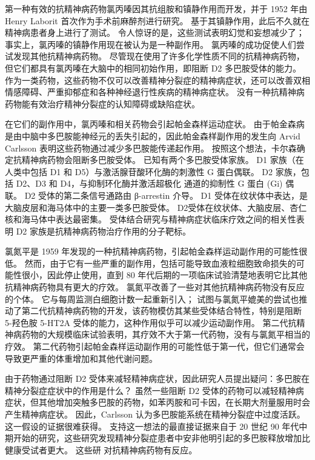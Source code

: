 第一种有效的抗精神病药物氯丙嗪因其抗组胺和镇静作用而开发，并于 1952 年由 Henry Laborit 首次作为手术前麻醉剂进行研究。
基于其镇静作用，此后不久就在精神病患者身上进行了测试。
令人惊讶的是，这些测试表明幻觉和妄想减少了；
事实上，氯丙嗪的镇静作用现在被认为是一种副作用。
氯丙嗪的成功促使人们尝试发现其他抗精神病药物。
尽管现在使用了许多化学性质不同的抗精神病药物，但它们都具有氯丙嗪在大脑中的相同初始作用，即阻断 D2 多巴胺受体的能力。
作为一类药物，这些药物不仅可以改善精神分裂症的精神病症状，还可以改善双相情感障碍、严重抑郁症和各种神经退行性疾病的精神病症状。
没有一种抗精神病药物能有效治疗精神分裂症的认知障碍或缺陷症状。


在它们的副作用中，氯丙嗪和相关药物会引起帕金森样运动症状。
由于帕金森病是由中脑中多巴胺能神经元的丢失引起的，因此帕金森样副作用的发生向 Arvid Carlsson 表明这些药物通过减少多巴胺能传递起作用。
按照这个想法，卡尔森确定抗精神病药物会阻断多巴胺受体。
已知有两个多巴胺受体家族。
D1 家族（在人类中包括 D1 和 D5）与激活腺苷酸环化酶的刺激性 G 蛋白偶联。
D2 家族，包括 D2、D3 和 D4，与抑制环化酶并激活超极化  通道的抑制性 G 蛋白 (Gi) 偶联。
D2 受体的第二条信号通路由 β-arrestin 介导。
D1 受体在纹状体中表达，是大脑皮层和海马体中的主要一类多巴胺受体。
D2受体在纹状体、大脑皮层、杏仁核和海马体中表达最密集。
受体结合研究与精神病症状临床疗效之间的相关性表明 D2 家族是抗精神病药物治疗作用的分子靶标。


氯氮平是 1959 年发现的一种抗精神病药物，引起帕金森样运动副作用的可能性很低。
然而，由于它有一些严重的副作用，包括可能导致血液粒细胞致命损失的可能性很小，因此停止使用，直到 80 年代后期的一项临床试验清楚地表明它比其他抗精神病药物具有更大的疗效。
氯氮平改善了一些对其他抗精神病药物没有反应的个体。
它与每周监测白细胞计数一起重新引入；
试图与氯氮平媲美的尝试也推动了第二代抗精神病药物的开发，该药物模仿其某些受体结合特性，特别是阻断 5-羟色胺 5-HT2A 受体的能力，这种作用似乎可以减少运动副作用。
第二代抗精神病药物的大规模临床试验表明，其疗效不大于第一代药物，没有与氯氮平相当的疗效。
第二代药物引起帕金森样运动副作用的可能性低于第一代，但它们通常会导致更严重的体重增加和其他代谢问题。


由于药物通过阻断 D2 受体来减轻精神病症状，因此研究人员提出疑问：多巴胺在精神分裂症症状中的作用是什么？
虽然一些阻断 D2 受体的药物可以减轻精神病症状，但其他增加突触多巴胺的药物，如苯丙胺和可卡因，在长期大剂量服用时会产生精神病症状。
因此，Carlsson 认为多巴胺能系统在精神分裂症中过度活跃。
这一假设的证据很难获得。
支持这一想法的最直接证据来自于 20 世纪 90 年代中期开始的研究，这些研究发现精神分裂症患者中安非他明引起的多巴胺释放增加比健康受试者更大。
这些研 对抗精神病药物有反应。


